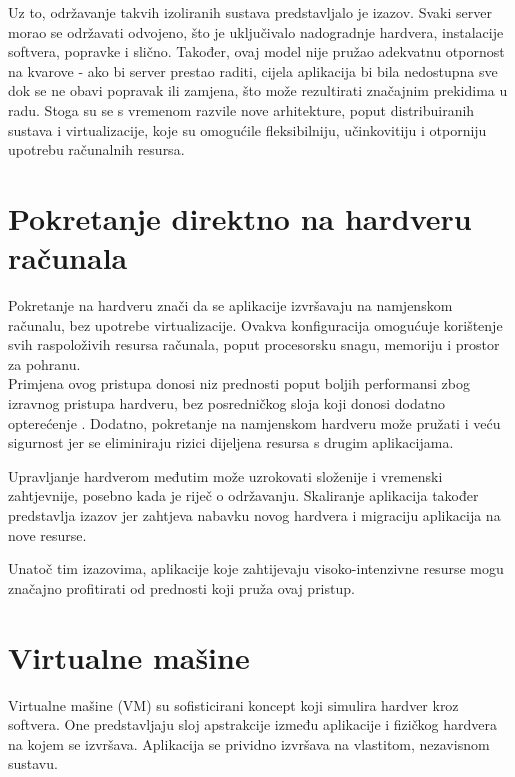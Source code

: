 \documentclass[times, utf8, diplomski]{fer}
\begin{document}
Uz to, održavanje takvih izoliranih sustava predstavljalo je izazov. Svaki server morao se održavati odvojeno, što je uključivalo nadogradnje hardvera, instalacije softvera, popravke i slično. Također, ovaj model nije pružao adekvatnu otpornost na kvarove - ako bi server prestao raditi, cijela aplikacija bi bila nedostupna sve dok se ne obavi popravak ili zamjena, što može rezultirati značajnim prekidima u radu.
Stoga su se s vremenom razvile nove arhitekture, poput distribuiranih sustava i virtualizacije, koje su omogućile fleksibilniju, učinkovitiju i otporniju upotrebu računalnih resursa.

\section{Pokretanje direktno na hardveru računala}

Pokretanje na hardveru  znači da se aplikacije izvršavaju na namjenskom računalu, bez upotrebe virtualizacije. Ovakva konfiguracija omogućuje korištenje svih raspoloživih resursa računala, poput procesorsku snagu, memoriju i prostor za pohranu. \\

Primjena ovog pristupa donosi niz prednosti poput boljih performansi zbog izravnog pristupa hardveru, bez posredničkog sloja koji donosi dodatno opterećenje . Dodatno, pokretanje na namjenskom hardveru može pružati i veću sigurnost jer se eliminiraju rizici dijeljena resursa s drugim aplikacijama.

Upravljanje hardverom međutim može uzrokovati složenije i vremenski zahtjevnije, posebno kada je riječ o održavanju. Skaliranje aplikacija također predstavlja izazov jer zahtjeva nabavku novog hardvera i migraciju aplikacija na nove resurse.

Unatoč tim izazovima, aplikacije koje zahtijevaju visoko-intenzivne resurse mogu značajno profitirati od prednosti koji pruža ovaj pristup.


\section{Virtualne mašine}

Virtualne mašine  (VM) su sofisticirani koncept koji simulira hardver kroz softvera. One predstavljaju sloj apstrakcije između aplikacije i fizičkog hardvera na kojem se izvršava. Aplikacija se prividno izvršava na vlastitom, nezavisnom sustavu. \\
\end{document}
